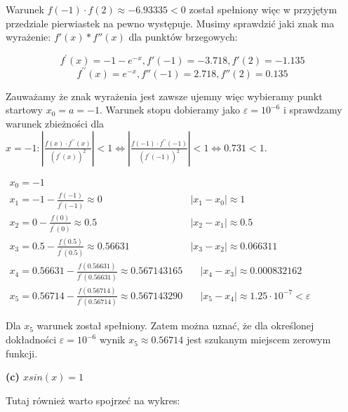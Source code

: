 \documentclass[5]{article}
\begin{document}
Warunek $f(-1) \cdot f(2) \approx-6.93335<0$ został spełniony więc w przyjętym przedziale pierwiastek na pewno występuje. Musimy sprawdzić jaki znak ma wyrażenie:  $f'(x)*f''(x)$ dla punktów brzegowych:

$$f^{\prime}(x)=-1-e^{-x}, f'(-1) = -3.718, f'(2) = -1.135$$
$$f^{\prime \prime}(x)=e^{-x}, f''(-1) = 2.718, f''(2) = 0.135$$

Zauważamy że znak wyrażenia jest zawsze ujemny więc wybieramy punkt startowy $x_{0}=a=-1$. Warunek stopu dobieramy jako $\varepsilon=10^{-6}$ i sprawdzamy warunek zbieżności dla $x=-1:\left|\frac{f(x) \cdot f^{\prime \prime}(x)}{\left(f^{\prime}(x)\right)^{2}}\right|<1 \Leftrightarrow\left|\frac{f(-1) \cdot f^{\prime \prime}(-1)}{\left(f^{\prime}(-1)\right)^{2}}\right|<1 \Leftrightarrow 0.731<1$.

$
\begin{array}{ll}
x_{0}=-1 \\
x_{1}=-1-\frac{f(-1)}{f^{\prime}(-1)} \approx 0 &\left|x_{1}-x_{0}\right| \approx 1 \\
x_{2}=0-\frac{f(0)}{f^{\prime}(0)} \approx 0.5 
&\left|x_{2}-x_{1}\right| \approx 0.5 \\ 
x_{3}=0.5-\frac{f(0.5)}{f^{\prime}(0.5)} \approx 0.56631
&\left|x_{3}-x_{2}\right| \approx 0.066311 \\
x_{4}=0.56631-\frac{f(0.56631)}{f^{\prime}(0.56631)} \approx 0.567143165 &\quad\left|x_{4}-x_{3}\right| \approx 0.000832162 \\
x_{5}=0.56714-\frac{f(0.56714)}{f^{\prime}(0.56714)} \approx 0.567143290 &\quad\left|x_{5}-x_{4}\right| \approx 1.25 \cdot 10^{-7}<\varepsilon
\end{array}
$

\vspace{2mm}

Dla $x_{5}$ warunek został spełniony. Zatem można uznać, że dla określonej dokładności $\varepsilon=10^{-6}$ wynik $x_{5} \approx 0.56714$ jest szukanym miejscem zerowym funkcji.

\vspace{5mm}

\textbf{(c) $x sin(x) = 1$}
\vspace{2mm}

Tutaj również warto spojrzeć na wykres: 
\end{document}
